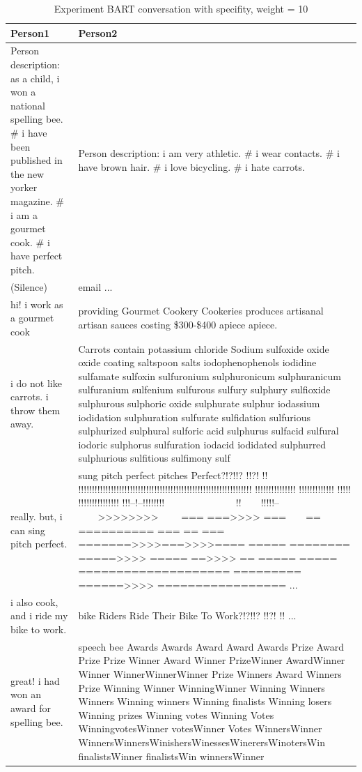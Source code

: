 \begin{table}[ht]
\centering
 \begin{tabular}{|p{7cm}|p{8cm}|} 
 \hline\hline
 \textbf{Person1} & \textbf{Person2} \\
 \hline\hline
 Person description: as a child, i won a national spelling bee. \# i have been published in the new yorker magazine. \# i am a gourmet cook. \# i have perfect pitch. & Person description: i am very athletic. \# i wear contacts. \# i have brown hair. \# i love bicycling. \# i hate carrots. \\
 \hline
 (Silence) & email ...\\ 
 \hline
 hi! i work as a gourmet cook & providing Gourmet Cookery Cookeries produces artisanal artisan sauces costing \$300-\$400 apiece apiece.\\
 \hline
 i do not like carrots. i throw them away. & Carrots contain potassium chloride Sodium sulfoxide oxide oxide coating saltspoon salts iodophenophenols iodidine sulfamate sulfoxin sulfuronium sulphuronicum sulphuranicum sulfuranium sulfenium sulfurous sulfury sulphury sulfioxide sulphurous sulphoric oxide sulphurate sulphur iodassium iodidation sulphuration sulfurate sulfidation sulfurious sulphurized sulphural sulforic acid sulphurus sulfacid sulfural iodoric sulphorus sulfuration iodacid iodidated sulphurred sulphurious sulfitious sulfimony sulf \\
 \hline 
 really. but, i can sing pitch perfect. & sung pitch perfect pitches Perfect?!?!!? !!?! !! !!!!!!!!!!!!!!!!!!!!!!!!!!!!!!!!!!!!!!!!!!!!!!!!!!!!!!!!!!!!!!!! !!!!!!!!!!!!!!! !!!!!!!!!!!!! !!!!! !!!!!!!!!!!!!!! !!!--!--!!!!!!!!~~~~~~~~~~~~~~ !!~~~~!!!!!--~~~~>>>>>>>>~~~~ === ===>>>> ===~~~~== ========== === == === =======>>>>===>>>>==== ===== ======== =====>>>> ===== ==>>>> == ===== ===== ==================== ========= ======>>>> ================= ...\\
 \hline
 i also cook, and i ride my bike to work. & bike Riders Ride Their Bike To Work?!?!!? !!?! !! ... \\
 \hline 
 great! i had won an award for spelling bee. & speech bee Awards Awards Award Award Awards Prize Award Prize Prize Winner Award Winner PrizeWinner AwardWinner Winner WinnerWinnerWinner Prize Winners Award Winners Prize Winning Winner WinningWinner Winning Winners Winners Winning winners Winning finalists Winning losers Winning prizes Winning votes Winning Votes WinningvotesWinner votesWinner Votes WinnersWinner WinnersWinnersWinishersWinessesWinerersWinotersWin finalistsWinner finalistsWin winnersWinner \\
 \hline\hline
 \end{tabular}
 \caption{Experiment BART conversation with specifity, weight = 10}
\label{tab:bart_conversation_idf10_ap}
\end{table}

